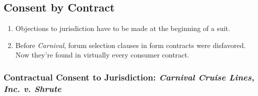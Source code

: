 \subsection{Consent by Contract}

\begin{enumerate}
    \item Objections to jurisdiction have to be made at the beginning of a suit.
    \item Before \emph{Carnival}, forum selection clauses in form contracts were disfavored. Now they're found in virtually every consumer contract.
\end{enumerate}

\subsubsection{Contractual Consent to Jurisdiction: \emph{Carnival Cruise Lines, Inc. v. Shrute}}

